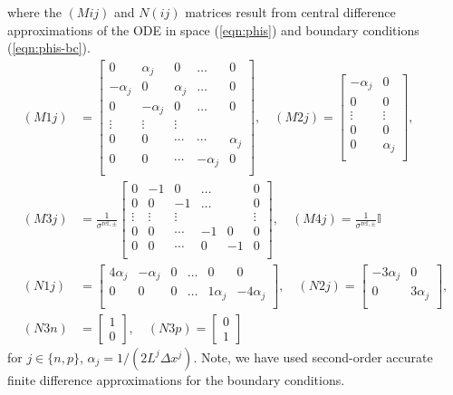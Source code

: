 \documentclass[12pt]{article}
\begin{document}
where the $(Mij)$ and $N(ij)$ matrices result from central difference approximations of the ODE in space (\ref{eqn:phis}) and boundary conditions (\ref{eqn:phis-bc}).
\begin{align}
(M1j) &=
\left[
\begin{array}{ccccc}
 0 & \alpha_{j} & 0 & \ldots & 0  \\
 -\alpha_{j} & 0 & \alpha_{j} & \ldots & 0  \\
 0 & -\alpha_{j} & 0 & \ldots & 0  \\
 \vdots & \vdots & \vdots &  &  \\
 0 & 0 & \cdots & \cdots & \alpha_{j} \\
 0 & 0 & \cdots & -\alpha_{j} & 0 \\
\end{array}
\right], \quad
(M2j) =
\left[
\begin{array}{cc}
 -\alpha_{j} & 0  \\
 0 & 0 \\
 \vdots & \vdots  \\
 0 & 0 \\
 0 & \alpha_{j} \\
\end{array}
\right], \qquad \\
(M3j) &= \frac{1}{\sigma^{\text{ref},\pm}}
\left[
\begin{array}{cccccc}
 0 & -1 & 0 & \ldots & & 0  \\
 0 & 0 & -1 & \ldots & & 0  \\
 \vdots & \vdots & \vdots & & & \vdots \\
 0 & 0 & \cdots & -1 & 0 & 0 \\
 0 & 0 & \cdots & 0 & -1 & 0 \\
\end{array}
\right], \quad
(M4j) = \frac{1}{\sigma^{\text{ref},\pm}} \mathbb{I} \\
(N1j) &=
\left[
\begin{array}{cccccc}
 4\alpha_{j} & -\alpha_{j} & 0 & \ldots & 0 & 0  \\
 0 & 0 & 0 & \ldots & 1\alpha_{j} & -4\alpha_{j}  \\
\end{array}
\right], \quad
(N2j) = 
\left[
\begin{array}{cc}
 -3\alpha_{j} & 0 \\
 0 & 3\alpha_{j} \\
\end{array}
\right], \\
(N3n) &= 
\left[
\begin{array}{c}
  1 \\
  0
\end{array}
\right], \quad
(N3p) = 
\left[
\begin{array}{c}
  0 \\
  1
\end{array}
\right]
\end{align}
for $j \in \{n,p\}$, $\alpha_{j} = 1 / (2 L^{j} \Delta x^{j})$. Note, we have used second-order accurate finite difference approximations for the boundary conditions.
\end{document}
